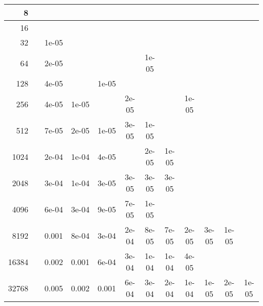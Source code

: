 \begin{appendices}
\begin{table}[H]
{\begin{tabular}{r|ccccccccccc}
8 &&&&&&&&&&&\\\hline

16 &&&&&&&&&&&\\\hline

32 &&1e-05 &&&&&&&&&\\\hline

64 &&2e-05 &&&&1e-05 &&&&&\\\hline

128 &&4e-05 &&1e-05 &&&&&&&\\\hline

256 &&4e-05 &1e-05 &&2e-05 &&&1e-05 &&&\\\hline

512 &&7e-05 &2e-05 &1e-05 &3e-05 &1e-05 &&&&&\\\hline

1024 &&2e-04 &1e-04 &4e-05 &&2e-05 &1e-05 &&&&\\\hline

2048 &&3e-04 &1e-04 &3e-05 &3e-05 &3e-05 &3e-05 &&&&\\\hline

4096 &&6e-04 &3e-04 &9e-05 &7e-05 &1e-05 &&&&&\\\hline

8192 &&0.001 &8e-04 &3e-04 &2e-04 &8e-05 &7e-05 &2e-05 &3e-05 &1e-05 &\\\hline

16384 &&0.002 &0.001 &6e-04 &3e-04 &1e-04 &1e-04 &4e-05 &&&\\\hline

32768 &&0.005 &0.002 &0.001 &6e-04 &3e-04 &2e-04 &1e-04 &1e-05 &2e-05 &1e-05\\\hline

\end{tabular}
}
\end{table}

%
%
%
%


\end{appendices}
